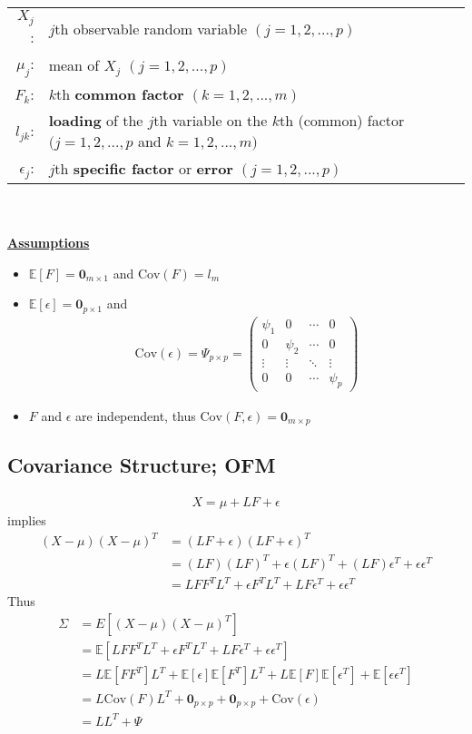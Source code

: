 \documentclass[12pt]{extarticle}
\newcommand{\<}{\langle}
\renewcommand{\>}{\rangle}
\theoremstyle{definition}
\begin{document}
\begin{tabular}{rl}
$X_j$:& $j$th observable random variable $(j=1,2,...,p)$\\
$\mu_j$:& mean of $X_j$ $(j=1,2,...,p)$\\
$F_k$:& $k$th \textbf{common factor} $(k=1,2,...,m)$\\
$l_{jk}$:& \textbf{loading} of the $j$th variable on the $k$th (common) factor $(j=1,2,...,p$ and $k=1,2,...,m)$\\
$\epsilon_j$:& $j$th \textbf{specific factor} or \textbf{error} $(j=1,2,...,p)$
\end{tabular}\\
\ \\
\underline{\textbf{Assumptions}}
\begin{itemize}
    \item $\mathbb{E}[F]= \textbf{0}_{m\times 1}$ and $\text{Cov}(F)=l_m$ \\
    \item $\mathbb{E}[\epsilon]=\textbf{0}_{p\times 1}$ and
    \begin{align*}
        \text{Cov}(\epsilon) =\Psi_{p\times p} = \left(\begin{array}{cccc}
        \psi_1 & 0 & \cdots & 0 \\
        0 & \psi_2 & \cdots & 0 \\
        \vdots & \vdots & \ddots & \vdots \\
        0 & 0 & \cdots & \psi_p
        \end{array} \right) 
    \end{align*}
    \item $F$ and $\epsilon$ are independent, thus $\text{Cov}(F,\epsilon) =\textbf{0}_{m\times p}$
\end{itemize}

\subsection{Covariance Structure; OFM}
\begin{align*}
    X=\mu + LF + \epsilon
\end{align*}
implies
\begin{align*}
    (X-\mu)(X-\mu)^T &= (LF+\epsilon)(LF+\epsilon)^T\\
    &= (LF)(LF)^T + \epsilon(LF)^T + (LF)\epsilon^T + \epsilon \epsilon^T\\
    &= LFF^T L^T + \epsilon F^T L^T + LF\epsilon^T + \epsilon \epsilon^T
\end{align*}
Thus
\begin{align*}
    \Sigma &= E[(X-\mu)(X-\mu)^T]\\
    &= \mathbb{E}[LFF^T L^T + \epsilon F^T L^T + LF\epsilon^T + \epsilon \epsilon^T]\\
    &= L\mathbb{E}[FF^T]L^T + \mathbb{E}[\epsilon] \mathbb{E}[F^T] L^T + L\mathbb{E}[F]\mathbb{E}[\epsilon^T] + \mathbb{E}[\epsilon \epsilon^T]\\
    &= L\text{Cov}(F)L^T + \textbf{0}_{p\times p} + \textbf{0}_{p\times p} + \text{Cov}(\epsilon)\\
    &=LL^T + \Psi
\end{align*}
\end{document}
